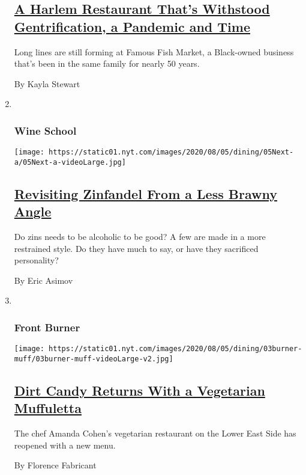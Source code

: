 \begin{enumerate}
{  \subsection{\texorpdfstring{\href{/2020/07/30/dining/famous-fish-market-harlem.html}{A
  Harlem Restaurant That's Withstood Gentrification, a Pandemic and
  Time}}{A Harlem Restaurant That's Withstood Gentrification, a Pandemic and Time}}\label{a-harlem-restaurant-thats-withstood-gentrification-a-pandemic-and-time}}

  Long lines are still forming at Famous Fish Market, a Black-owned
  business that's been in the same family for nearly 50 years.

  By Kayla Stewart
\item ~
  \hypertarget{wine-school}{%
  \subsubsection{Wine School}\label{wine-school}}

  \texttt{[image: https://static01.nyt.com/images/2020/08/05/dining/05Next-a/05Next-a-videoLarge.jpg]}

  \hypertarget{revisiting-zinfandel-from-a-less-brawny-angle}{%
  \subsection{\texorpdfstring{\href{/2020/07/30/dining/drinks/wine-school-assignment-zinfandel.html}{Revisiting
  Zinfandel From a Less Brawny
  Angle}}{Revisiting Zinfandel From a Less Brawny Angle}}\label{revisiting-zinfandel-from-a-less-brawny-angle}}

  Do zins needs to be alcoholic to be good? A few are made in a more
  restrained style. Do they have much to say, or have they sacrificed
  personality?

  By Eric Asimov
\item ~
  \hypertarget{front-burner}{%
  \subsubsection{Front Burner}\label{front-burner}}

  \texttt{[image: https://static01.nyt.com/images/2020/08/05/dining/03burner-muff/03burner-muff-videoLarge-v2.jpg]}

  \hypertarget{dirt-candy-returns-with-a-vegetarian-muffuletta}{%
  \subsection{\texorpdfstring{\href{/2020/08/03/dining/dirt-candy-vegetarian-muffuletta.html}{Dirt
  Candy Returns With a Vegetarian
  Muffuletta}}{Dirt Candy Returns With a Vegetarian Muffuletta}}\label{dirt-candy-returns-with-a-vegetarian-muffuletta}}

  The chef Amanda Cohen's vegetarian restaurant on the Lower East Side
  has reopened with a new menu.

  By Florence Fabricant
\end{enumerate}


